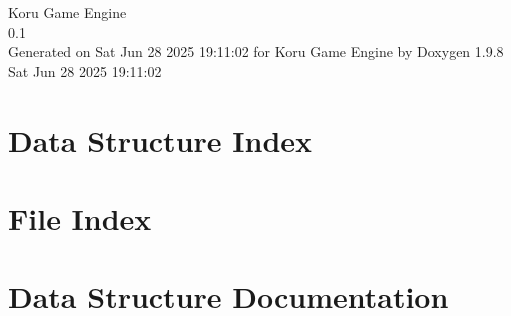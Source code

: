\documentclass[twoside]{book}
\newcommand{\+}{\discretionary{\mbox{\scriptsize$\hookleftarrow$}}{}{}}
\newcommand{\clearemptydoublepage}{%
    \newpage{\pagestyle{empty}\cleardoublepage}%
  }
\begin{document}
  \raggedbottom
    \hypersetup{pageanchor=false,
                bookmarksnumbered=true,
                pdfencoding=unicode
               }
  \begin{titlepage}
  \vspace*{7cm}
  \begin{center}%
  {\Large Koru Game Engine}\\
  [1ex]\large 0.\+1 \\
  \vspace*{1cm}
  {\large Generated on Sat Jun 28 2025 19\+:11\+:02 for Koru Game Engine by Doxygen 1.9.8}\\
    \vspace*{0.5cm}
    {\small Sat Jun 28 2025 19:11:02}
  \end{center}
  \end{titlepage}
  \clearemptydoublepage
  \tableofcontents
  \clearemptydoublepage
  \hypersetup{pageanchor=true}

\chapter{Data Structure Index}

\chapter{File Index}

\chapter{Data Structure Documentation}



























\end{document}
